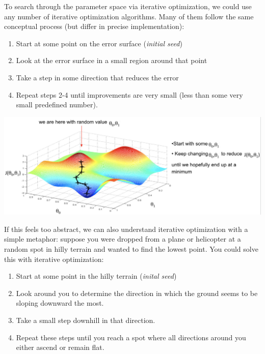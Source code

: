 \documentclass[
  letterpaper,
  DIV=11,
  numbers=noendperiod]{scrartcl}
\providecommand{\tightlist}{%
  \setlength{\itemsep}{0pt}\setlength{\parskip}{0pt}}\usepackage{longtable,booktabs,array}
\begin{document}
To search through the parameter space via iterative optimization, we
could use any number of iterative optimization algorithms. Many of them
follow the same conceptual process (but differ in precise
implementation):

\begin{enumerate}
\def\labelenumi{\arabic{enumi}.}
\tightlist
\item
  Start at some point on the error surface (\emph{initial seed})
\item
  Look at the error surface in a small region around that point
\item
  Take a step in some direction that reduces the error
\item
  Repeat steps 2-4 until improvements are very small (less than some
  very small predefined number).
\end{enumerate}

\includegraphics{../assests/images/gradient-descent.png}

If this feels too abstract, we can also understand iterative
optimization with a simple metaphor: suppose you were dropped from a
plane or helicopter at a random spot in hilly terrain and wanted to find
the lowest point. You could solve this with iterative optimization:

\begin{enumerate}
\def\labelenumi{\arabic{enumi}.}
\tightlist
\item
  Start at some point in the hilly terrain (\emph{inital seed})
\item
  Look around you to determine the direction in which the ground seems
  to be sloping downward the most.
\item
  Take a small step downhill in that direction.
\item
  Repeat these steps until you reach a spot where all directions around
  you either ascend or remain flat.
\end{enumerate}
\end{document}
